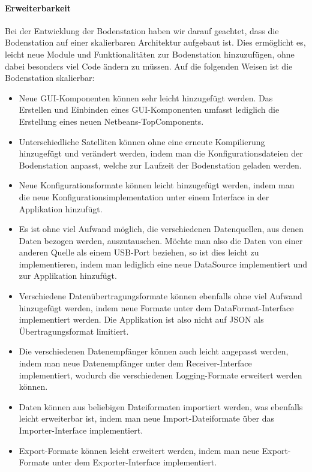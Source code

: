 \paragraph{Erweiterbarkeit}
Bei der Entwicklung der Bodenstation haben wir darauf geachtet, dass die Bodenstation auf einer skalierbaren Architektur aufgebaut ist. Dies ermöglicht es, leicht neue Module und Funktionalitäten zur Bodenstation hinzuzufügen, ohne dabei besonders viel Code ändern zu müssen. Auf die folgenden Weisen ist die Bodenstation skalierbar:
\begin{itemize}
	\item Neue GUI-Komponenten können sehr leicht hinzugefügt werden. Das Erstellen und Einbinden eines GUI-Komponenten umfasst lediglich die Erstellung eines neuen Netbeans-TopComponents.
	\item Unterschiedliche Satelliten können ohne eine erneute Kompilierung hinzugefügt und verändert werden, indem man die Konfigurationsdateien der Bodenstation anpasst, welche zur Laufzeit der Bodenstation geladen werden.
	\item Neue Konfigurationsformate können leicht hinzugefügt werden, indem man die neue Konfigurationsimplementation unter einem Interface in der Applikation hinzufügt.
	\item Es ist ohne viel Aufwand möglich, die verschiedenen Datenquellen, aus denen Daten bezogen werden, auszutauschen. Möchte man also die Daten von einer anderen Quelle als einem USB-Port beziehen, so ist dies leicht zu implementieren, indem man lediglich eine neue DataSource implementiert und zur Applikation hinzufügt.
	\item Verschiedene Datenübertragungsformate können ebenfalls ohne viel Aufwand hinzugefügt werden, indem neue Formate unter dem DataFormat-Interface implementiert werden. Die Applikation ist also nicht auf JSON als Übertragungsformat limitiert.
	\item Die verschiedenen Datenempfänger können auch leicht angepasst werden, indem man neue Datenempfänger unter dem Receiver-Interface implementiert, wodurch die verschiedenen Logging-Formate erweitert werden können.
	\item Daten können aus beliebigen Dateiformaten importiert werden, was ebenfalls leicht erweiterbar ist, indem man neue Import-Dateiformate über das Importer-Interface implementiert.
	\item Export-Formate können leicht erweitert werden, indem man neue Export-Formate unter dem Exporter-Interface implementiert.
\end{itemize}

